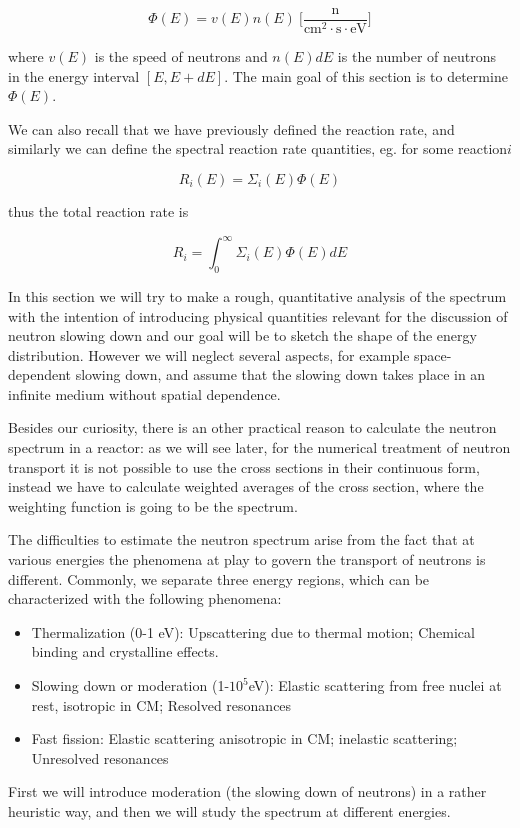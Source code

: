 $$\Phi(E)=v(E)n(E) \: \Big[\frac{\text{n}}{\text{cm}^2\cdot\text{s}\cdot\text{eV}}\Big]$$

\noindent where $v(E)$ is the speed of neutrons and $n(E)dE$ is the number of neutrons in the energy interval $[E,E+dE]$. The main goal of this section is to determine $\Phi(E)$.

We can also recall that we have previously defined the reaction rate, and similarly we can define the spectral reaction rate quantities, eg. for some reaction$i$

$$R_i(E)=\Sigma_i(E)\Phi(E)$$

thus the total reaction rate is

$$R_i=\int_0^\infty\Sigma_i(E)\Phi(E)dE$$

In this section we will try to make a rough, quantitative analysis of the spectrum with the intention of introducing physical quantities relevant for the discussion of neutron slowing down and our goal will be to sketch the shape of the energy distribution. However we will neglect several aspects, for example space-dependent slowing down, and assume that the slowing down takes place in an infinite medium without spatial dependence.

Besides our curiosity, there is an other practical reason to calculate the neutron spectrum in a reactor: as we will see later, for the numerical treatment of neutron transport it is not possible to use the cross sections in their continuous form, instead we have to calculate weighted averages of the cross section, where the weighting function is going to be the spectrum. 

The difficulties to estimate the neutron spectrum arise from the fact that at various energies the phenomena at play to govern the transport of neutrons is different. Commonly, we separate three energy regions, which can be characterized with the following phenomena:

\begin{itemize}
\item Thermalization (0-1 eV): Upscattering due to thermal motion; Chemical binding and crystalline effects.
\item Slowing down or moderation (1-$10^5$eV): Elastic scattering from free nuclei at rest, isotropic in CM; Resolved resonances
\item Fast fission: Elastic scattering anisotropic in CM; inelastic scattering; Unresolved resonances
\end{itemize}

First we will introduce moderation (the slowing down of neutrons) in a rather heuristic way, and then we will study the spectrum at different energies.

